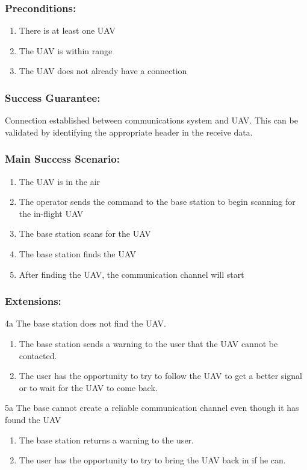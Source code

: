 \documentclass[ProductRequirements.tex]{subfiles}
\begin{document}
		\subsubsection*{Preconditions:}
			\begin{enumerate}\itemsep1pt
				\item There is at least one UAV
				\item The UAV is within range
				\item The UAV does not already have a connection
			\end{enumerate}
		\subsubsection*{Success Guarantee:}
			Connection established between communications system and UAV. This can be validated by identifying the appropriate header in the receive data. 
		\subsubsection*{Main Success Scenario:}
			\begin{enumerate}\itemsep1pt
				\item The UAV is in the air
				\item The operator sends the command to the base station to begin scanning for the in-flight UAV
				\item The base station scans for the UAV
				\item The base station finds the UAV
				\item After finding the UAV, the communication channel will start
			\end{enumerate}
		\subsubsection*{Extensions:}
		4a The base station does not find the UAV.
		\begin{enumerate}
			\item The base station sends a warning to the user that the UAV cannot be contacted.
			\item The user has the opportunity to try to follow the UAV to get a better signal or to wait for the UAV to come back.
		\end{enumerate}
		5a The base cannot create a reliable communication channel even though it has found the UAV
		\begin{enumerate}
			\item The base station returns a warning to the user.
			\item The user has the opportunity to try to bring the UAV back in if he can.
		\end{enumerate}
\end{document}
